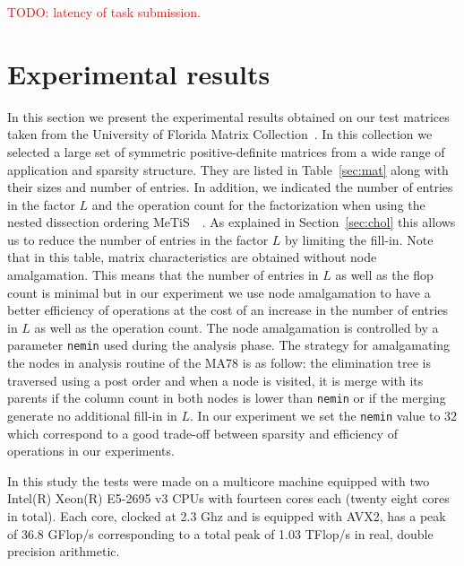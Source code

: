 \documentclass{article}
\newcommand{\alert}[1]{\textcolor{red}{#1}\xspace}
\newcommand{\TODO}[1]{\alert{TODO: #1}\xspace}
\newcommand{\metis}{{\sc Me$\!$T$\!$iS\ }}
\begin{document}
\TODO{latency of task submission.}

\section{Experimental results}\label{sec:experiments}

In this section we present the experimental results obtained on our
test matrices taken from the University of Florida Matrix
Collection~\cite{d.h:11}. In this collection we selected a large set
of symmetric positive-definite matrices from a wide range of
application and sparsity structure. They are listed in
Table~\ref{sec:mat} along with their sizes and number of entries. In
addition, we indicated the number of entries in the factor $L$ and the
operation count for the factorization when using the nested dissection
ordering \metis~\cite{k.k:98}. As explained in Section~\ref{sec:chol}
this allows us to reduce the number of entries in the factor $L$ by
limiting the fill-in. Note that in this table, matrix characteristics
are obtained without node amalgamation. This means that the number of
entries in $L$ as well as the flop count is minimal but in our
experiment we use node amalgamation to have a better efficiency of
operations at the cost of an increase in the number of entries in $L$
as well as the operation count. The node amalgamation is controlled by
a parameter \texttt{nemin} used during the analysis phase. The
strategy for amalgamating the nodes in analysis routine of the MA78 is
as follow: the elimination tree is traversed using a post order and
when a node is visited, it is merge with its parents if the column
count in both nodes is lower than \texttt{nemin} or if the merging
generate no additional fill-in in $L$. In our experiment we set the
\texttt{nemin} value to $32$ which correspond to a good trade-off
between sparsity and efficiency of operations in our experiments.

In this study the tests were made on a multicore machine equipped with
two Intel(R) Xeon(R) E5-2695 v3 CPUs with fourteen cores each (twenty
eight cores in total). Each core, clocked at 2.3 Ghz and is equipped
with AVX2, has a peak of 36.8 GFlop/s corresponding to a total peak of
1.03 TFlop/s in real, double precision arithmetic.
\end{document}
